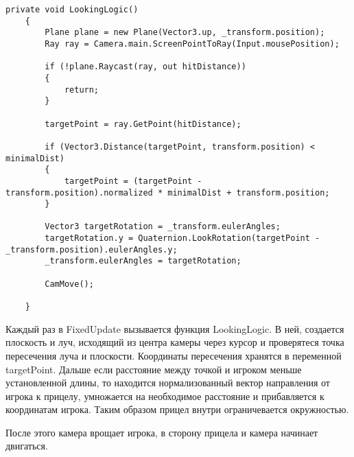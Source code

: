 \documentclass[14pt, titlepage,fleqn,a4paper]{extarticle}
\begin{document}
    \begin{lstlisting}[caption= Основная функция камеры, label=lst:test]
    private void LookingLogic()
    {
        Plane plane = new Plane(Vector3.up, _transform.position);
        Ray ray = Camera.main.ScreenPointToRay(Input.mousePosition);

        if (!plane.Raycast(ray, out hitDistance))
        {
            return;
        }

        targetPoint = ray.GetPoint(hitDistance);

        if (Vector3.Distance(targetPoint, transform.position) < minimalDist)
        {
            targetPoint = (targetPoint - transform.position).normalized * minimalDist + transform.position;
        }

        Vector3 targetRotation = _transform.eulerAngles;
        targetRotation.y = Quaternion.LookRotation(targetPoint - _transform.position).eulerAngles.y; 
        _transform.eulerAngles = targetRotation;

        CamMove();

    }
    \end{lstlisting}

    Каждый раз в FixedUpdate вызывается функция LookingLogic. В ней, создается плоскость и луч, исходящий из центра камеры через курсор и проверятеся точка пересечения луча и плоскости. Координаты пересечения хранятся в переменной targetPoint. Дальше если расстояние между точкой и игроком меньше установленной длины, то находится нормализованный вектор направления от игрока к прицелу, умножается на необходимое расстояние и прибавляется к координатам игрока. 
    Таким образом прицел внутри ограничевается окружностью.
    
    После этого камера врощает игрока, в сторону прицела и камера начинает двигаться.
    
\end{document}
